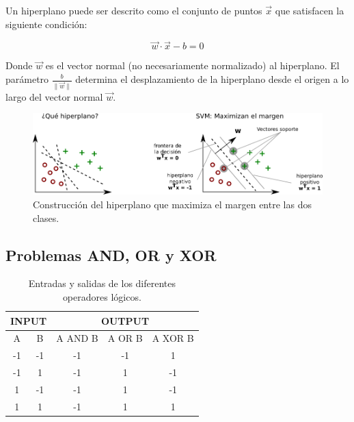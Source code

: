 \documentclass[12pt,spanish,a4paper]{article}
\numberwithin{equation}{section}
\begin{document}
Un hiperplano puede ser descrito como el conjunto de puntos
\({\displaystyle {\vec {x}}}\) que satisfacen la siguiente condición:

\begin{equation}
{\displaystyle {\vec {w}}\cdot {\vec {x}} - b = 0}
\end{equation}

Donde \({\displaystyle {\vec {w}}}\) es el vector normal (no
necesariamente normalizado) al hiperplano. El parámetro
\({\displaystyle {\tfrac {b}{\|{\vec {w}}\|}}}\) determina el
desplazamiento de la hiperplano desde el origen a lo largo del vector
normal \({\displaystyle {\vec {w}}}\).

\begin{figure}[h]
\begin{center}
\includegraphics[width=0.90\linewidth]{./figures/maximizar_margen.png}
\caption{Construcción del hiperplano que maximiza el margen entre las dos clases.}
\label{fig:maximizar_margen}
\end{center}
\end{figure}

\clearpage

\subsection{Problemas AND, OR y XOR}\label{problemas-and-or-y-xor}

\begin{table}[]
\centering
\begin{tabular}{ccccc}
\hline\hline
\multicolumn{2}{c|}{INPUT} & \multicolumn{3}{c}{OUTPUT} \\
\hline\hline
A           & B           & A AND B & A OR B & A XOR B \\
\hline
-1          & -1          & -1      & -1     & 1       \\
-1          & 1           & -1      & 1      & -1      \\
1           & -1          & -1      & 1      & -1      \\
1           & 1           & -1      & 1      & 1       \\
\hline\hline
\end{tabular}
\caption{Entradas y salidas de los diferentes operadores lógicos.}
\label{tab:andorxor}
\end{table}
\end{document}
